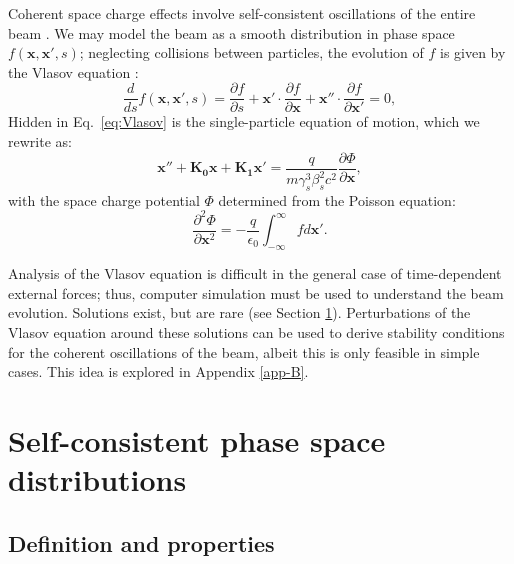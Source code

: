 Coherent space charge effects involve self-consistent oscillations of the entire beam \cite{book:Reiser, Wangler2008, Cousineau2003}. We may model the beam as a smooth distribution in phase space $f(\mathbf{x}, \mathbf{x}', s)$; neglecting collisions between particles, the evolution of $f$ is given by the Vlasov equation \cite{Vlasov1961}:
%
\begin{equation} \label{eq:Vlasov}
    \frac{d}{ds}{f(\mathbf{x}, \mathbf{x}', s)} = 
    \frac{\partial{f}}{\partial{s}} +
    \mathbf{x}' \cdot \frac{\partial{f}}{\partial{\mathbf{x}}} +
    \mathbf{x}'' \cdot \frac{\partial{f}}{\partial{\mathbf{x'}}}
    = 0,
\end{equation}
%
Hidden in Eq.~\eqref{eq:Vlasov} is the single-particle equation of motion, which we rewrite as:
%
\begin{equation}
    \mathbf{x}'' + \mathbf{K_0} \mathbf{x} + \mathbf{K_1} \mathbf{x}'
    =
    \frac{q}{m\gamma_s^3\beta_s^2c^2} \frac{\partial{\Phi}}{\partial\mathbf{x}},
\end{equation}
%
with the space charge potential $\Phi$ determined from the Poisson equation:
%
\begin{equation} \label{eq:Poisson}
    \frac{\partial^2{\Phi}}{\partial{\mathbf{x}^2}} = -\frac{q}{\epsilon_0}
    \int_{-\infty}^{\infty}{f}d\mathbf{x}'.
\end{equation}
%

Analysis of the Vlasov equation is difficult in the general case of time-dependent external forces; thus, computer simulation must be used to understand the beam evolution. Solutions exist, but are rare (see Section \ref{sec:Self-consistent phase space distributions}). Perturbations of the Vlasov equation around these solutions can be used to derive stability conditions for the coherent oscillations of the beam, albeit this is only feasible in simple cases. This idea is explored in Appendix \ref{app-B}. 




\section{Self-consistent phase space distributions}\label{sec:Self-consistent phase space distributions}

\subsection{Definition and properties}

